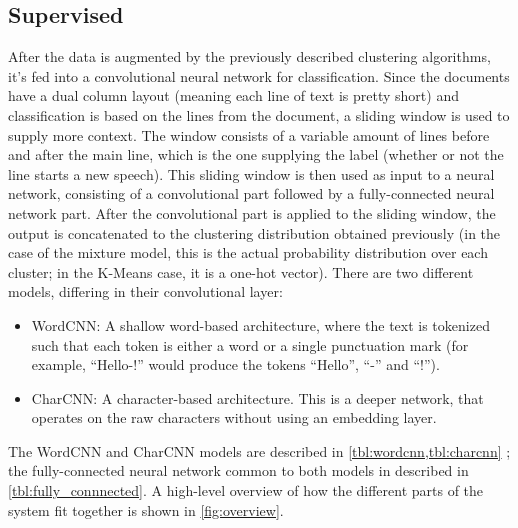 \subsection{Supervised}%
\label{sec:sup}
After the data is augmented by the previously described clustering algorithms,
it's fed into a convolutional neural network for classification. Since the
documents have a dual column layout (meaning each line of text is pretty short)
and classification is based on the lines from the document, a sliding window is
used to supply more context. The window consists of a variable amount of lines
before and after the main line, which is the one supplying the label (whether
or not the line starts a new speech). This sliding window is then used as input
to a neural network, consisting of a convolutional part followed by a
fully-connected neural network part. After the convolutional part is applied to
the sliding window, the output is concatenated to the clustering distribution
obtained previously (in the case of the mixture model, this is the actual
probability distribution over each cluster; in the K-Means case, it is a
one-hot vector). There are two different models, differing in their
convolutional layer:
\begin{itemize}
  \item WordCNN: A shallow word-based architecture\citep{kim2014conv}, where the
  text is tokenized such that each token is either a word or a single punctuation
  mark (for example, ``Hello-!'' would produce the tokens ``Hello'', ``-'' and
  ``!'').
  \item CharCNN: A character-based architecture\citep{zhang2015character}. This
  is a deeper network, that operates on the raw characters without using an
  embedding layer.
\end{itemize}
The WordCNN and CharCNN models are described in \cref{tbl:wordcnn,tbl:charcnn}
; the fully-connected neural network common to both models in described in
\cref{tbl:fully_connnected}. A high-level overview of how the different parts
of the system fit together is shown in \cref{fig:overview}.

